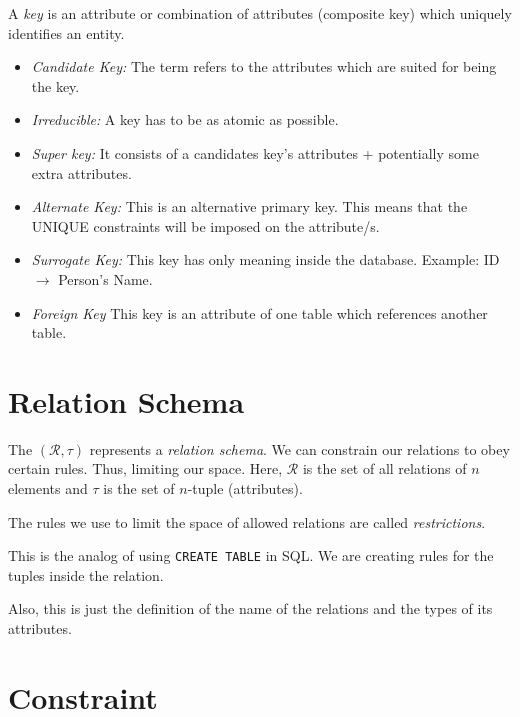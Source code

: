 A \emph{key} is an attribute or combination of attributes (composite key) which uniquely identifies an entity.

\begin{itemize}

    \item \emph{Candidate Key:} The term refers to the attributes which are suited for being the key.

    \item \emph{Irreducible:} A key has to be as atomic as possible.

    \item \emph{Super key:} It consists of a candidates key's attributes + potentially some extra attributes.

    \item \emph{Alternate Key:} This is an alternative primary key. This means that the UNIQUE constraints will be imposed on the attribute/s.

    \item \emph{Surrogate Key:} This key has only meaning inside the database. Example: ID \(\to\) Person's Name.

    \item \emph{Foreign Key} This key is an attribute of one table which references another table.

\end{itemize}

\section{Relation Schema}

The \((\mathcal{R}, \tau)\) represents a \emph{relation schema}. We can constrain our relations to obey certain rules. Thus, limiting our space. 
Here, \(\mathcal{R}\) is the set of all relations of \(n\) elements and \(\tau\) is the set of \(n\)-tuple (attributes).

The rules we use to limit the space of allowed relations are called \emph{restrictions}.

This is the analog of using \verb|CREATE TABLE| in SQL. We are creating rules for 
the tuples inside the relation.

Also, this is just the definition of the name of the relations and the types of its attributes. 

\section{Constraint}

